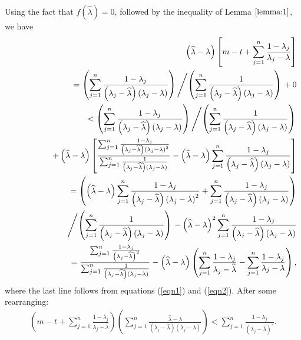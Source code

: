 \documentclass[final,leqno,onefignum,onetabnum]{siamltex1213}
\begin{document}
Using the fact that $f(\widehat{\lambda})=0$, followed by the inequality of Lemma $\ref{lemma:1}$, we have
\footnotesize
\begin{eqnarray*}
&&{\displaystyle \left(\widehat{\lambda}-\lambda\right)\left[m-t+\sum_{j=1}^n\frac{1-\lambda_j}{\lambda_j-\lambda}\right] }\\
&&\hspace{1cm}= \left(\sum_{j=1}^n\frac{1-\lambda_j}{\left(\lambda_j-\widehat{\lambda}\right)\left(\lambda_j-\lambda\right)}\right) \left/
\left(\sum_{j=1}^n\frac{1}{\left(\lambda_j-\widehat{\lambda}\right)\left(\lambda_j-\lambda\right)}
\right)\right. + 0 \\
&&{\displaystyle  \hspace{1cm} < \left(\sum_{j=1}^n\frac{1-\lambda_j}{\left(\lambda_j-\widehat{\lambda}\right)\left(\lambda_j-\lambda\right)}\right) \left/ \left(\sum_{j=1}^n\frac{1}{\left(\lambda_j-\widehat{\lambda}\right)\left(\lambda_j-\lambda\right)}\right) \right. }\\
&&{\displaystyle  \hspace{1.5cm} + \left(\widehat{\lambda}-\lambda\right)\left[\frac{\sum_{j=1}^n\frac{1-\lambda_j}{\left(\lambda_j-\widehat{\lambda}\right)\left(\lambda_j-\lambda\right)^2}}{\sum_{j=1}^n\frac{1}{\left(\lambda_j-\widehat{\lambda}\right)\left(\lambda_j-\lambda\right)}}-\left(\widehat{\lambda}-\lambda\right)\sum_{j=1}^n\frac{1-\lambda_j}{\left(\lambda_j-\widehat{\lambda}\right)\left(\lambda_j-\lambda\right)}\right]} \\
&&{\displaystyle  \hspace{1cm} = \left(\left(\widehat{\lambda}-\lambda\right) \sum_{j=1}^n\frac{1-\lambda_j}{\left(\lambda_j-\widehat{\lambda}\right)\left(\lambda_j-\lambda\right)^2} + \sum_{j=1}^n\frac{1-\lambda_j}{\left(\lambda_j-\widehat{\lambda}\right)\left(\lambda_j-\lambda\right)}\right)  }\\
&&{\displaystyle \hspace{1.5cm} \left/
\left(\sum_{j=1}^n\frac{1}{\left(\lambda_j-\widehat{\lambda}\right)\left(\lambda_j-\lambda\right)}\right)\right. - \left( \widehat{\lambda}-\lambda \right)^2 \sum_{j=1}^n\frac{1-\lambda_j}{\left(\lambda_j-\widehat{\lambda}\right)\left(\lambda_j-\lambda\right)}} \\
&&{\displaystyle  \hspace{1cm} = \frac{\sum_{j=1}^n\frac{1-\lambda_j}{\left(\lambda_j-\widehat{\lambda}\right)^2}} 
{\sum_{j=1}^n\frac{1}{\left(\lambda_j-\widehat{\lambda}\right)\left(\lambda_j-\lambda\right)}} - \left( \widehat{\lambda}-\lambda \right) \left(\sum_{j=1}^n\frac{1-\lambda_j}{\lambda_j-\widehat{\lambda}}-\sum_{j=1}^n\frac{1-\lambda_j}{\lambda_j-\lambda}\right),}
\end{eqnarray*} 	
\normalsize
where the last line follows from equations (\ref{eqn1}) and (\ref{eqn2}).  After some rearranging:
\begin{eqnarray}
{\displaystyle  \left(m-t+\sum_{j=1}^n\frac{1-\lambda_j}{\lambda_j-\widehat{\lambda}}\right)\left(\sum_{j=1}^n\frac{\widehat{\lambda}-\lambda}{\left(\lambda_j-\widehat{\lambda}\right)\left(\lambda_j-\lambda\right)}\right) }<{\displaystyle   \sum_{j=1}^n\frac{1-\lambda_j}{\left(\lambda_j-\widehat{\lambda}\right)^2}.}\nonumber
\end{eqnarray}
\end{document}
